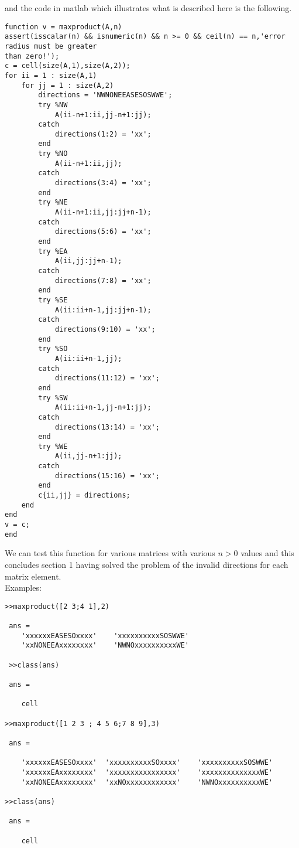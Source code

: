 \documentclass[10pt]{article}
\begin{document}
\vspace{-10pt}
and the code in {\color{red}matlab} which illustrates what is described here is the 
following.
\begin{lstlisting}
function v = maxproduct(A,n)
assert(isscalar(n) && isnumeric(n) && n >= 0 && ceil(n) == n,'error radius must be greater 
than zero!');
c = cell(size(A,1),size(A,2));
for ii = 1 : size(A,1)
    for jj = 1 : size(A,2)
        directions = 'NWNONEEASESOSWWE';
        try %NW
            A(ii-n+1:ii,jj-n+1:jj);
        catch
            directions(1:2) = 'xx';
        end
        try %NO
            A(ii-n+1:ii,jj);
        catch
            directions(3:4) = 'xx';
        end
        try %NE
            A(ii-n+1:ii,jj:jj+n-1);
        catch
            directions(5:6) = 'xx';
        end
        try %EA
            A(ii,jj:jj+n-1);
        catch
            directions(7:8) = 'xx';
        end
        try %SE
            A(ii:ii+n-1,jj:jj+n-1);
        catch
            directions(9:10) = 'xx';
        end
        try %SO
            A(ii:ii+n-1,jj);
        catch
            directions(11:12) = 'xx';
        end
        try %SW
            A(ii:ii+n-1,jj-n+1:jj);
        catch
            directions(13:14) = 'xx';
        end
        try %WE
            A(ii,jj-n+1:jj);
        catch
            directions(15:16) = 'xx';
        end
        c{ii,jj} = directions;
    end
end
v = c;
end
\end{lstlisting}
We can test this function for various matrices with various $n>0$ values and this 
concludes section 1 having solved the problem of the invalid directions for each matrix 
element.\\
Examples:
\begin{lstlisting}
>>maxproduct([2 3;4 1],2)

 ans =
    'xxxxxxEASESOxxxx'    'xxxxxxxxxxSOSWWE'
    'xxNONEEAxxxxxxxx'    'NWNOxxxxxxxxxxWE'
    
 >>class(ans)
 
 ans = 

    cell
    
>>maxproduct([1 2 3 ; 4 5 6;7 8 9],3)

 ans = 

    'xxxxxxEASESOxxxx'  'xxxxxxxxxxSOxxxx'    'xxxxxxxxxxSOSWWE'
    'xxxxxxEAxxxxxxxx'  'xxxxxxxxxxxxxxxx'    'xxxxxxxxxxxxxxWE'
    'xxNONEEAxxxxxxxx'  'xxNOxxxxxxxxxxxx'    'NWNOxxxxxxxxxxWE'
    
>>class(ans)

 ans =
  
    cell
\end{lstlisting}
\end{document}
